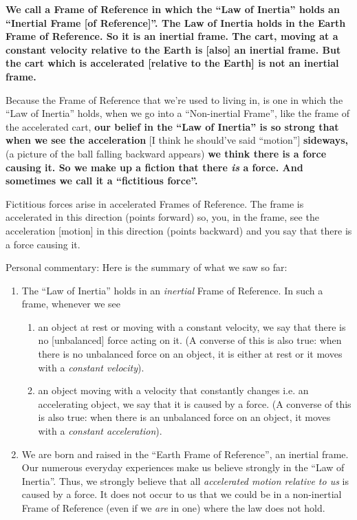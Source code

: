 \documentclass[a6paper]{article}
\newcommand{\perscom}[1]{
    {\footnotesize Personal commentary:  #1}
}
\begin{document}
\textbf{We call a Frame of Reference in which the ``Law of Inertia'' holds an ``Inertial Frame [of Reference]''. The Law of Inertia holds in the Earth Frame of Reference. So it is an inertial frame. The cart, moving at a constant velocity relative to the Earth is [also] an inertial frame. But the cart which is accelerated [relative to the Earth] is not an inertial frame.}

Because the Frame of Reference that we're used to living in, is one in which the ``Law of Inertia'' holds, when we go into a ``Non-inertial Frame'', like the frame of the accelerated cart, \textbf{our belief in the ``Law of Inertia'' is so strong that when we see the acceleration} [I think he should've said ``motion''] \textbf{sideways,} (a picture of the ball falling backward appears) \textbf{we think there is a force causing it. So we make up a fiction that there \emph{is} a force. And sometimes we call it a ``fictitious force''.}

Fictitious forces arise in accelerated Frames of Reference. The frame is accelerated in this direction (points forward) so, you, in the frame, see the acceleration [motion] in this direction (points backward) and you say that there is a force causing it. 

\perscom{ Here is the summary of what we saw so far:
\begin{enumerate}
    \item The ``Law of Inertia'' holds in an \emph{inertial} Frame of Reference. In such a frame, whenever we see 
        \begin{enumerate} 
            \item an object at rest or moving with a constant velocity, we say that there is no [unbalanced] force acting on it. (A converse of this is also true: when there is no unbalanced force on an object, it is either at rest or it moves with a \emph{constant velocity}).
            \item an object moving with a velocity that constantly changes i.e. an accelerating object, we say that it is caused by a force. (A converse of this is also true: when there is an unbalanced force on an object, it moves with a \emph{constant acceleration}).
        \end{enumerate}
    \item We are born and raised in the ``Earth Frame of Reference'', an inertial frame. Our numerous everyday experiences make us believe strongly in the ``Law of Inertia''. Thus, we strongly believe that all \emph{accelerated motion relative to us} is caused by a force. It does not occur to us that we could be in a non-inertial Frame of Reference (even if we \emph{are} in one) where the law does not hold.

\end{enumerate}
}
\end{document}
